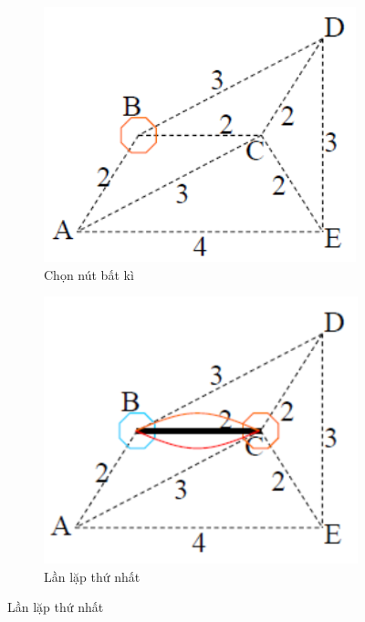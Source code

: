 \documentclass[a4paper, 11pt]{article}
\begin{document}
\begin{figure}[h]
  \centering
  \begin{subfigure}{.3\linewidth}
      \centering
      \includegraphics[width=\textwidth,height=\textheight,keepaspectratio]{ni_1.png}
      \caption{Chọn nút bất kì}
  \end{subfigure}
      \hfill
  \begin{subfigure}{.3\linewidth}
      \centering
      \includegraphics[width=\textwidth,height=\textheight,keepaspectratio]{ni_2.png}
      \caption{Lần lặp thứ nhất}

\end{subfigure}
\end{figure}
\end{document}
